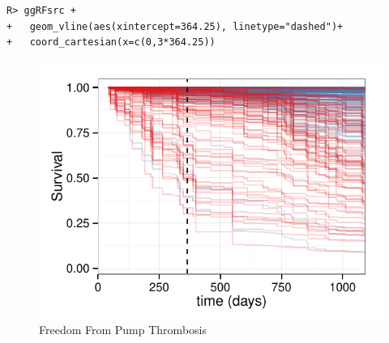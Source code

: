 \documentclass[nojss]{jss}
\begin{document}
\begin{knitrout}\footnotesize
{}\color{fgcolor}\begin{kframe}
\begin{verbatim}
R> ggRFsrc +
+   geom_vline(aes(xintercept=364.25), linetype="dashed")+
+   coord_cartesian(x=c(0,3*364.25))
\end{verbatim}
\end{kframe}\begin{figure}[!htpb]

{\centering \includegraphics[width=\maxwidth]{figure/rfs-rfsrc-plot3Mnth-1} 

}

\caption[Freedom From Pump Thrombosis]{Freedom From Pump Thrombosis\label{fig:rfsrc-plot3Mnth}}
\end{figure}


\end{knitrout}
\end{document}
